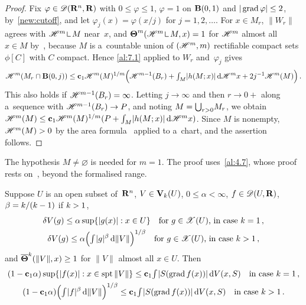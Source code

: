 \begin{proof}
    Fix $\varphi \in \mathscr{D}(\mathbf{R}^{n},\mathbf{R})$ with $0 \le \varphi \le 1$, $\varphi = 1$ on
    $\mathbf{B}(0,1)$ and $|\operatorname{grad} \varphi| \le 2$, by~\ref{new:cutoff}, and let $\varphi_j(x) =
    \varphi(x/j)$ for $j = 1, 2, \ldots$. For $x \in M_r$, $\|W_r\|$ agrees with $\HM^m \restrict M$
    near~$x$, and $\density^m(\HM^m \restrict M, x) = 1$ for $\mathscr{H}^m$ almost all $x \in M$
    by~\cite[3.2.19]{Federer1969}, because $M$ is a~countable union of $(\mathscr{H}^m,m)$ rectifiable
    compact sets $\phi[C]$ with $C$ compact. Hence \ref{al:7.1} applied to $W_r$ and~$\varphi_j$
    gives
    \begin{displaymath}
        \mathscr{H}^m(M_r \cap \mathbf{B}(0,j)) \le \mathbf{c}_1 \mathscr{H}^m(M)^{1/m} \Big( \mathscr{H}^{m-1}(B_r) +
        {\textstyle\int_{M}^{}} |h(M;x)| \,\mathrm{d} \mathscr{H}^m x + 2 j^{-1} \mathscr{H}^m(M) \Big) \,.
    \end{displaymath}
    This also holds if $\mathscr{H}^{m-1}(B_r) = \infty$. Letting $j \to \infty$ and then $r \to 0+$ along
    a~sequence with $\mathscr{H}^{m-1}(B_r) \to P$, and noting $M = {{\textstyle \bigcup}}_{r > 0} M_r$, we obtain
    $\mathscr{H}^m(M) \le \mathbf{c}_1 \mathscr{H}^m(M)^{1/m} (P + {\textstyle\int_{M}^{}} |h(M;x)| \,\mathrm{d} \mathscr{H}^m x)$. Since $M$ is
    nonempty, $\mathscr{H}^m(M) > 0$ by the area formula~\cite[3.2.3, 3.2.5]{Federer1969} applied to
    a~chart, and the assertion follows.
\end{proof}

\begin{remark}
    \label{rem:7.2}
    The hypothesis $M \ne \varnothing$ is needed for $m = 1$. The proof uses~\ref{al:4.7}, whose
    proof rests on~\cite[4.5.6, 4.5.12]{Federer1969}, beyond the formalised range.
\end{remark}

\begin{theorem}
    \label{al:7.3}
    Suppose $U$ is an open subset of~$\mathbf{R}^{n}$, $V \in \mathbf{V}_{k}(U)$, $0 \le \alpha <
    \infty$, $f \in \mathscr{D}(U,\mathbf{R})$, $\beta = k/(k-1)$ if $k > 1$,
    \begin{gather*}
        \delta V(g) \le \alpha \sup \{ |g(x)| : x \in U \} \quad \text{for $g \in \mathscr{X}(U)$, in case
        $k = 1$} \,, \\
        \delta V(g) \le \alpha \Big( {\textstyle\int_{}^{}} |g|^\beta \,\mathrm{d} \|V\| \Big)^{1/\beta} \quad
        \text{for $g \in \mathscr{X}(U)$, in case $k > 1$} \,,
    \end{gather*}
    and $\boldsymbol{\overline{\Theta}}^{k}(\|V\|,x) \ge 1$ for $\|V\|$ almost all $x \in U$. Then
    \begin{gather*}
        (1 - \mathbf{c}_1 \alpha) \sup \{ |f(x)| : x \in \operatorname{spt} \|V\| \} \le \mathbf{c}_1 {\textstyle\int_{}^{}}
        |S(\operatorname{grad} f(x))| \,\mathrm{d} V(x,S) \quad \text{in case $k = 1$} \,, \\
        (1 - \mathbf{c}_1 \alpha) \Big( {\textstyle\int_{}^{}} |f|^\beta \,\mathrm{d} \|V\| \Big)^{1/\beta} \le
        \mathbf{c}_1 {\textstyle\int_{}^{}} |S(\operatorname{grad} f(x))| \,\mathrm{d} V(x,S) \quad \text{in case $k > 1$} \,.
    \end{gather*}
\end{theorem}

